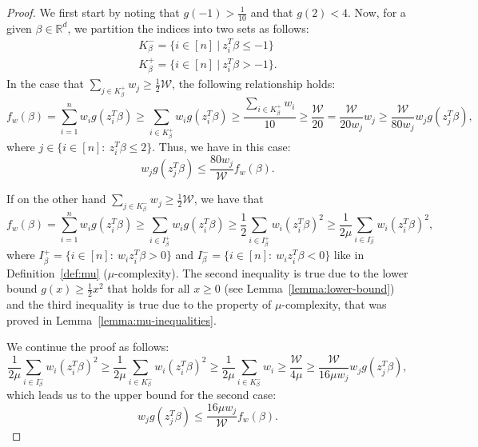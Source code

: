 \begin{proof}
    We first start by noting that $g(-1) > \frac{1}{10}$
    and that $g(2) < 4$. Now, for a given $\beta \in \mathbb{R}^d$,
    we partition the indices into two sets as follows:
    \begin{gather*}
        K_\beta^- = \{ i \in [n] \ | \ z_i^T \beta \leq -1 \} \\
        K_\beta^+ = \{ i \in [n] \ | \ z_i^T \beta > -1 \}.
    \end{gather*}
    In the case that
    $\sum_{j \in K_\beta^+} w_j \geq \frac{1}{2} \mathcal{W}$, the following
    relationship holds:
    \begin{equation*}
        f_w(\beta) = \sum_{i=1}^n w_i g(z_i^T \beta)
        \geq \sum_{i \in K_\beta^+} w_i g(z_i^T \beta)
        \geq \frac{\sum_{i \in K_\beta^+} w_i}{10}
        \geq \frac{\mathcal{W}}{20}
        = \frac{\mathcal{W}}{20 w_j} w_j
        \geq \frac{\mathcal{W}}{80 w_j} w_j g(z_j^T \beta),
    \end{equation*}
    where $j \in \{i \in [n]:\ z_i^T \beta \leq 2 \}$.
    Thus, we have in this case:
    \begin{equation*}
        w_jg(z_j^T\beta) \leq \frac{80w_j}{\mathcal{W}} f_w(\beta).
    \end{equation*}

    \noindent If on the other hand
    $\sum_{j \in K_\beta^-} w_j \geq \frac{1}{2} \mathcal{W}$,
    we have that
    \begin{equation*}
        f_w(\beta)
        = \sum_{i=1}^n w_i g(z_i^T \beta)
        \geq \sum_{i \in I_\beta^+} w_i g(z_i^T \beta)
        \geq \frac{1}{2} \sum_{i \in I_\beta^+} w_i (z_i^T \beta)^2
        \geq \frac{1}{2\mu} \sum_{i \in I_\beta^-} w_i (z_i^T \beta)^2,
    \end{equation*}
    where $I_\beta^+ = \{i \in [n]:\ w_i z_i^T \beta > 0 \}$
    and $I_\beta^- = \{i \in [n]:\ w_i z_i^T \beta < 0 \}$ like in
    Definition~\ref{def:mu} ($\mu$-complexity).
    The second inequality is true due to the lower bound
    $g(x) \geq \frac{1}{2} x^2$ that holds for all $x \geq 0$
    (see Lemma~\ref{lemma:lower-bound}) and
    the third inequality is true due to the property of $\mu$-complexity,
    that was proved in Lemma~\ref{lemma:mu-inequalities}.

    We continue the proof as follows:
    \begin{equation*}
        \frac{1}{2\mu} \sum_{i \in I_\beta^-} w_i (z_i^T \beta)^2
        \geq \frac{1}{2 \mu} \sum_{i \in K_\beta^-} w_i (z_i^T \beta)^2
        \geq \frac{1}{2 \mu} \sum_{i \in K_\beta^-} w_i
        \geq \frac{\mathcal{W}}{4 \mu}
        \geq \frac{\mathcal{W}}{16 \mu w_j} w_j g(z_j^T \beta),
    \end{equation*}
    which leads us to the upper bound for the second case:
    \begin{equation*}
        w_jg(z_j^T\beta) \leq \frac{16 \mu w_j}{\mathcal{W}} f_w(\beta).
    \end{equation*}


\end{proof}
